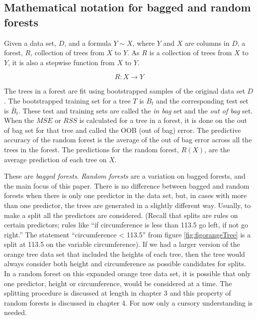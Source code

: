 \documentclass[12pt,twoside]{reedthesis}
\begin{document}
  \subsection{Mathematical notation for bagged and random
  forests}\label{mathematical-notation-for-bagged-and-random-forests}
  
  Given a data set, \(D\), and a formula \(Y \sim X\), where \(Y\) and
  \(X\) are columns in \(D\), a forest, \(R\), collection of trees from
  \(X\) to \(Y\). As \(R\) is a collection of trees from \(X\) to \(Y\),
  it is also a stepwise function from \(X\) to \(Y\).
  
  \[R:X \rightarrow Y\]
  
  The trees in a forest are fit using bootstrapped samples of the original
  data set \(D\). The bootstrapped training set for a tree \(T\) is
  \(B_t\) and the corresponding test set is \(\bar{B}_t\). These test and
  training sets are called the \emph{in bag} set and the \emph{out of bag}
  set. When the \(MSE\) or \(RSS\) is calculated for a tree in a forest,
  it is done on the out of bag set for that tree and called the OOB (out
  of bag) error. The predictive accuracy of the random forest is the
  average of the out of bag error across all the trees in the forest. The
  predictions for the random forest, \(R(X)\), are the average prediction
  of each tree on \(X\).
  
  These are \emph{bagged forests}. \emph{Random forests} are a variation
  on bagged forests, and the main focus of this paper. There is no
  difference between bagged and random forests when there is only one
  predictor in the data set, but, in cases with more than one predictor,
  the trees are generated in a slightly different way. Usually, to make a
  split all the predictors are considered. (Recall that splits are rules
  on certain predictors; rules like ``if circumference is less than 113.5
  go left, if not go right.'' The statement ``circumference \textless{}
  113.5'' from figure \ref{fig:figorangeTree} is a split at 113.5 on the
  variable circumference). If we had a larger version of the orange tree
  data set that included the heights of each tree, then the tree would
  always consider both height and circumference as possible candidates for
  splits. In a random forest on this expanded orange tree data set, it is
  possible that only one predictor, height or circumference, would be
  considered at a time. The splitting procedure is discussed at length in
  chapter 3 and this property of random forests is discussed in chapter 4.
  For now only a cursory understanding is needed.
  
\end{document}
